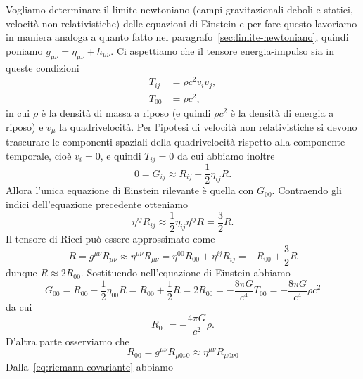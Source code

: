 Vogliamo determinare il limite newtoniano (campi gravitazionali deboli e
statici, velocità non relativistiche) delle equazioni di Einstein e per fare
questo lavoriamo in maniera analoga a quanto fatto nel
paragrafo~\ref{sec:limite-newtoniano}, quindi poniamo
$g_{\mu\nu} = \eta_{\mu\nu} + h_{\mu\nu}$.  Ci aspettiamo che il tensore
energia-impulso sia in queste condizioni
\begin{subequations}
  \begin{align}
    T_{ij} &= \rho c^{2} v_{i} v_{j}, \\
    T_{00} &= \rho c^{2},
  \end{align}
\end{subequations}
in cui $\rho$ è la densità di massa a riposo (e quindi $\rho c^{2}$ è la densità
di energia a riposo) e $v_{\mu}$ la quadrivelocità.  Per l'ipotesi di velocità
non relativistiche si devono trascurare le componenti spaziali della
quadrivelocità rispetto alla componente temporale, cioè $v_{i} = 0$, e quindi
$T_{ij} = 0$ da cui abbiamo inoltre
\begin{equation}
  0 = G_{ij} \approx R_{ij} - \frac{1}{2}\eta_{ij}R.
\end{equation}
Allora l'unica equazione di Einstein rilevante è quella con $G_{00}$.
Contraendo gli indici dell'equazione precedente otteniamo
\begin{equation}
  \eta^{ij}R_{ij} \approx \frac{1}{2} \eta_{ij}\eta^{ij} R = \frac{3}{2} R.
\end{equation}
Il tensore di Ricci può essere approssimato come
\begin{equation}
  R = g^{\mu\nu}R_{\mu\nu} \approx \eta^{\mu\nu} R_{\mu\nu} = \eta^{00}R_{00} +
  \eta^{ij}R_{ij} = -R_{00} + \frac{3}{2} R
\end{equation}
dunque $R \approx 2 R_{00}$.  Sostituendo nell'equazione di Einstein abbiamo
\begin{equation}
  G_{00} = R_{00} - \frac{1}{2} \eta_{00}R = R_{00} + \frac{1}{2} R = 2 R_{00} =
  -\frac{8\pi G}{c^{4}} T_{00} = -\frac{8\pi G}{c^{4}} \rho c^{2}
\end{equation}
da cui
\begin{equation}
  R_{00} = -\frac{4\pi G}{c^{2}} \rho.
\end{equation}
D'altra parte osserviamo che
\begin{equation}
  R_{00} = g^{\mu\nu}R_{\mu 0\nu 0} \approx \eta^{\mu\nu}R_{\mu 0\nu 0}
\end{equation}
Dalla~\eqref{eq:riemann-covariante} abbiamo
